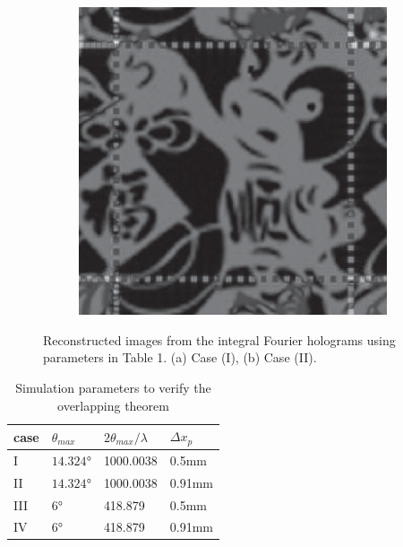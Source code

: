 \documentclass[10pt,letterpaper]{article}
\begin{document}
\begin{figure}[htbp]
\begin{subfigure}[b]{0.22\linewidth}
  \includegraphics[width=1\columnwidth]{cow_overlapping_1}
  \centering
  \caption{}
  \end{subfigure}
\caption{Reconstructed images from the integral Fourier holograms using parameters in Table 1. (a) Case (I), (b) Case (II).}
\label{fig_12}
\end{figure}

\begin{table}[!htb]
\centering\caption{Simulation parameters to verify the overlapping theorem}
\begin{tabular}{l l l l}
\hline
case & $\theta_{max}$ & $2\theta_{max}/\lambda$ & $\Delta x_p$ \\ \hline
I    & $14.324°$      & 1000.0038               & 0.5mm        \\ 
II   & $14.324°$      & 1000.0038               & 0.91mm       \\ 
III  & $6°$           & 418.879                 & 0.5mm        \\ 
IV   & $6°$           & 418.879                 & 0.91mm       \\ \hline
\end{tabular}
\label{lb_2}
\end{table}
\end{document}
